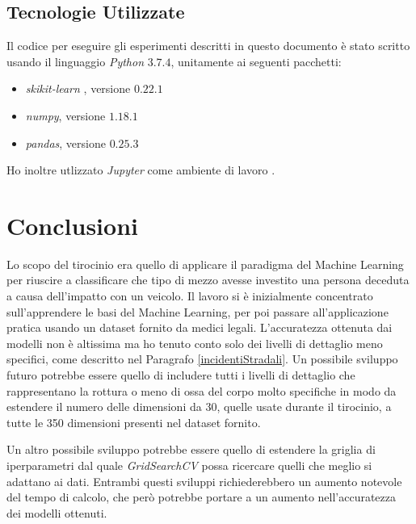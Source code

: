\documentclass[12pt,italian]{report}
\begin{document}
\clearpage
\section{Tecnologie Utilizzate}
Il codice per eseguire gli esperimenti descritti in questo documento è stato scritto usando il linguaggio \emph{Python} $3.7.4$, unitamente ai seguenti pacchetti:
\begin{itemize}
	\item \emph{skikit-learn} \cite{scikit-learn}, versione $0.22.1$
	\item \emph{numpy}, versione $1.18.1$
	\item \emph{pandas}, versione $0.25.3$
\end{itemize} 
 Ho inoltre utlizzato \emph{Jupyter} come ambiente di lavoro \cite{jupyter}.

% 
% 
\chapter*{Conclusioni}

Lo scopo del tirocinio era quello di applicare il paradigma del Machine Learning per riuscire a classificare che tipo di mezzo avesse investito una persona deceduta a causa dell'impatto con un veicolo. Il lavoro si è inizialmente concentrato sull'apprendere le basi del Machine Learning, per poi passare all'applicazione pratica usando un dataset fornito da medici legali. L'accuratezza ottenuta dai modelli non è altissima ma ho tenuto conto solo dei livelli di dettaglio meno specifici, come descritto nel Paragrafo \ref{incidentiStradali}. Un possibile sviluppo futuro potrebbe essere quello di includere tutti i livelli di dettaglio che rappresentano la rottura o meno di ossa del corpo molto specifiche in modo da estendere il numero delle dimensioni da 30, quelle usate durante il tirocinio, a tutte le 350 dimensioni presenti nel dataset fornito. 

Un altro possibile sviluppo potrebbe essere quello di estendere la griglia di iperparametri dal quale \emph{GridSearchCV} possa ricercare quelli che meglio si adattano ai dati.
Entrambi questi sviluppi richiederebbero un aumento notevole del tempo di calcolo, che però potrebbe portare a un aumento nell'accuratezza dei modelli ottenuti.

%
%



\end{document}
